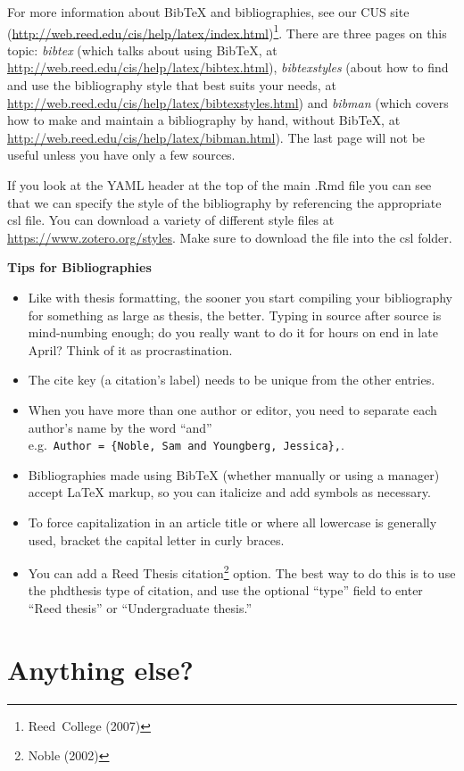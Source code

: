 \documentclass[12pt,twoside]{reedthesis}
\providecommand{\tightlist}{%
  \setlength{\itemsep}{0pt}\setlength{\parskip}{0pt}}
\begin{document}
For more information about BibTeX and bibliographies, see our CUS site (\url{http://web.reed.edu/cis/help/latex/index.html})\footnote{Reed~College (2007)}. There are three pages on this topic: \emph{bibtex} (which talks about using BibTeX, at \url{http://web.reed.edu/cis/help/latex/bibtex.html}), \emph{bibtexstyles} (about how to find and use the bibliography style that best suits your needs, at \url{http://web.reed.edu/cis/help/latex/bibtexstyles.html}) and \emph{bibman} (which covers how to make and maintain a bibliography by hand, without BibTeX, at \url{http://web.reed.edu/cis/help/latex/bibman.html}). The last page will not be useful unless you have only a few sources.

If you look at the YAML header at the top of the main .Rmd file you can see that we can specify the style of the bibliography by referencing the appropriate csl file. You can download a variety of different style files at \url{https://www.zotero.org/styles}. Make sure to download the file into the csl folder.

\textbf{Tips for Bibliographies}
\begin{itemize}
\tightlist
\item
  Like with thesis formatting, the sooner you start compiling your bibliography for something as large as thesis, the better. Typing in source after source is mind-numbing enough; do you really want to do it for hours on end in late April? Think of it as procrastination.
\item
  The cite key (a citation's label) needs to be unique from the other entries.
\item
  When you have more than one author or editor, you need to separate each author's name by the word ``and'' e.g.~\texttt{Author\ =\ \{Noble,\ Sam\ and\ Youngberg,\ Jessica\},}.
\item
  Bibliographies made using BibTeX (whether manually or using a manager) accept LaTeX markup, so you can italicize and add symbols as necessary.
\item
  To force capitalization in an article title or where all lowercase is generally used, bracket the capital letter in curly braces.
\item
  You can add a Reed Thesis citation\footnote{Noble (2002)} option. The best way to do this is to use the phdthesis type of citation, and use the optional ``type'' field to enter ``Reed thesis'' or ``Undergraduate thesis.''
\end{itemize}
\section{Anything else?}\label{anything-else}
\end{document}
